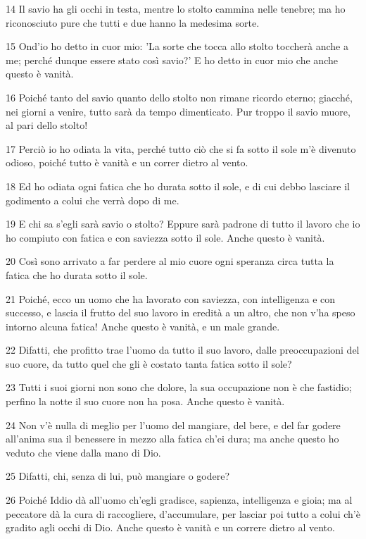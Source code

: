 \par 14 Il savio ha gli occhi in testa, mentre lo stolto cammina nelle tenebre; ma ho riconosciuto pure che tutti e due hanno la medesima sorte.
\par 15 Ond'io ho detto in cuor mio: 'La sorte che tocca allo stolto toccherà anche a me; perché dunque essere stato così savio?' E ho detto in cuor mio che anche questo è vanità.
\par 16 Poiché tanto del savio quanto dello stolto non rimane ricordo eterno; giacché, nei giorni a venire, tutto sarà da tempo dimenticato. Pur troppo il savio muore, al pari dello stolto!
\par 17 Perciò io ho odiata la vita, perché tutto ciò che si fa sotto il sole m'è divenuto odioso, poiché tutto è vanità e un correr dietro al vento.
\par 18 Ed ho odiata ogni fatica che ho durata sotto il sole, e di cui debbo lasciare il godimento a colui che verrà dopo di me.
\par 19 E chi sa s'egli sarà savio o stolto? Eppure sarà padrone di tutto il lavoro che io ho compiuto con fatica e con saviezza sotto il sole. Anche questo è vanità.
\par 20 Così sono arrivato a far perdere al mio cuore ogni speranza circa tutta la fatica che ho durata sotto il sole.
\par 21 Poiché, ecco un uomo che ha lavorato con saviezza, con intelligenza e con successo, e lascia il frutto del suo lavoro in eredità a un altro, che non v'ha speso intorno alcuna fatica! Anche questo è vanità, e un male grande.
\par 22 Difatti, che profitto trae l'uomo da tutto il suo lavoro, dalle preoccupazioni del suo cuore, da tutto quel che gli è costato tanta fatica sotto il sole?
\par 23 Tutti i suoi giorni non sono che dolore, la sua occupazione non è che fastidio; perfino la notte il suo cuore non ha posa. Anche questo è vanità.
\par 24 Non v'è nulla di meglio per l'uomo del mangiare, del bere, e del far godere all'anima sua il benessere in mezzo alla fatica ch'ei dura; ma anche questo ho veduto che viene dalla mano di Dio.
\par 25 Difatti, chi, senza di lui, può mangiare o godere?
\par 26 Poiché Iddio dà all'uomo ch'egli gradisce, sapienza, intelligenza e gioia; ma al peccatore dà la cura di raccogliere, d'accumulare, per lasciar poi tutto a colui ch'è gradito agli occhi di Dio. Anche questo è vanità e un correre dietro al vento.

